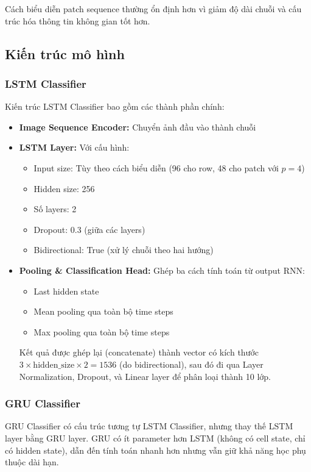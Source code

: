 Cách biểu diễn patch sequence thường ổn định hơn vì giảm độ dài chuỗi và cấu trúc hóa thông tin không gian tốt hơn.

\subsection{Kiến trúc mô hình}

\subsubsection{LSTM Classifier}

Kiến trúc LSTM Classifier bao gồm các thành phần chính:

\begin{itemize}
    \item \textbf{Image Sequence Encoder:} Chuyển ảnh đầu vào thành chuỗi
    \item \textbf{LSTM Layer:} Với cấu hình:
    \begin{itemize}
        \item Input size: Tùy theo cách biểu diễn (96 cho row, 48 cho patch với $p=4$)
        \item Hidden size: 256
        \item Số layers: 2
        \item Dropout: 0.3 (giữa các layers)
        \item Bidirectional: True (xử lý chuỗi theo hai hướng)
    \end{itemize}
    \item \textbf{Pooling \& Classification Head:} Ghép ba cách tính toán từ output RNN:
    \begin{itemize}
        \item Last hidden state
        \item Mean pooling qua toàn bộ time steps
        \item Max pooling qua toàn bộ time steps
    \end{itemize}
    Kết quả được ghép lại (concatenate) thành vector có kích thước $3 \times \text{hidden\_size} \times 2 = 1536$ (do bidirectional), sau đó đi qua Layer Normalization, Dropout, và Linear layer để phân loại thành 10 lớp.
\end{itemize}

\subsubsection{GRU Classifier}

GRU Classifier có cấu trúc tương tự LSTM Classifier, nhưng thay thế LSTM layer bằng GRU layer. GRU có ít parameter hơn LSTM (không có cell state, chỉ có hidden state), dẫn đến tính toán nhanh hơn nhưng vẫn giữ khả năng học phụ thuộc dài hạn.

